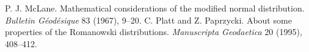  P. J. McLane. Mathematical considerations of the modified normal distribution. \emph{Bulletin G\'eod\'esique} 83 (1967), 9--20. %
 C. Platt and Z. Paprzycki. About some properties of the Romanowski distributions. \emph{Manuscripta Geodaetica} 20 (1995), 408--412. %
